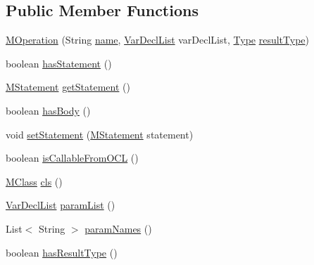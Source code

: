 \subsection*{Public Member Functions}
\begin{DoxyCompactItemize}
\item 
\hyperlink{classorg_1_1tzi_1_1use_1_1uml_1_1mm_1_1_m_operation_ae70aa7c89c6d955473423c53b82ad3e1}{M\-Operation} (String \hyperlink{classorg_1_1tzi_1_1use_1_1uml_1_1mm_1_1_m_model_element_impl_ac9997b04c10d247c21c22d431d99400d}{name}, \hyperlink{classorg_1_1tzi_1_1use_1_1uml_1_1ocl_1_1expr_1_1_var_decl_list}{Var\-Decl\-List} var\-Decl\-List, \hyperlink{interfaceorg_1_1tzi_1_1use_1_1uml_1_1ocl_1_1type_1_1_type}{Type} \hyperlink{classorg_1_1tzi_1_1use_1_1uml_1_1mm_1_1_m_operation_a05101d3e2ad7b78e470772c7822af12d}{result\-Type})
\item 
boolean \hyperlink{classorg_1_1tzi_1_1use_1_1uml_1_1mm_1_1_m_operation_a78de63b07ed257084c3827fa1f40133f}{has\-Statement} ()
\item 
\hyperlink{classorg_1_1tzi_1_1use_1_1uml_1_1sys_1_1soil_1_1_m_statement}{M\-Statement} \hyperlink{classorg_1_1tzi_1_1use_1_1uml_1_1mm_1_1_m_operation_a02a9ef42ef83a990ecae567e0d62b82e}{get\-Statement} ()
\item 
boolean \hyperlink{classorg_1_1tzi_1_1use_1_1uml_1_1mm_1_1_m_operation_a6bc88e414e224abce9cbb1bbfcfd19d1}{has\-Body} ()
\item 
void \hyperlink{classorg_1_1tzi_1_1use_1_1uml_1_1mm_1_1_m_operation_a2fb01ad4013320ea85af48340890c3d8}{set\-Statement} (\hyperlink{classorg_1_1tzi_1_1use_1_1uml_1_1sys_1_1soil_1_1_m_statement}{M\-Statement} statement)
\item 
boolean \hyperlink{classorg_1_1tzi_1_1use_1_1uml_1_1mm_1_1_m_operation_a59f0606e3aa8fa630e947f44c07cd1ec}{is\-Callable\-From\-O\-C\-L} ()
\item 
\hyperlink{interfaceorg_1_1tzi_1_1use_1_1uml_1_1mm_1_1_m_class}{M\-Class} \hyperlink{classorg_1_1tzi_1_1use_1_1uml_1_1mm_1_1_m_operation_a4e1a522d698db3b99bcc284e9f84f82e}{cls} ()
\item 
\hyperlink{classorg_1_1tzi_1_1use_1_1uml_1_1ocl_1_1expr_1_1_var_decl_list}{Var\-Decl\-List} \hyperlink{classorg_1_1tzi_1_1use_1_1uml_1_1mm_1_1_m_operation_a6c9d87eda5fbf3fdbc156c42ad60c11f}{param\-List} ()
\item 
List$<$ String $>$ \hyperlink{classorg_1_1tzi_1_1use_1_1uml_1_1mm_1_1_m_operation_aa04fc851f1367fe02d9911cadacc0a20}{param\-Names} ()
\item 
boolean \hyperlink{classorg_1_1tzi_1_1use_1_1uml_1_1mm_1_1_m_operation_a5f74070cdd65d0f64a2d984b8d23c0ca}{has\-Result\-Type} ()

\end{DoxyCompactItemize}
